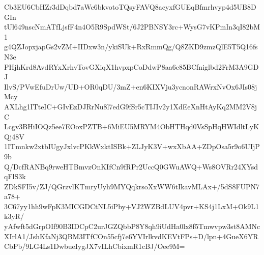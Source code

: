 Cb3EU6CbHZr3dDqbd7aWc6bkvotoTQsyFAVQ8acyxfGUEqBfmrhvyp4d5UB8DGIn
tUl649nscNmATfLjsfF4n4O5R9SpdWSt/6J2PBNSY3rc+WysG7vKPmIn3qI82bM1
g4QZJopxjapGs2vZM+IIDxw3n/ykiSUk+RxRmmQg/Q8ZKD9zmzQlE5T5Q16fsN3e
PHjhKrd8AvdRYxXrhvTovGXiqX1hvpxpCoDdwP8aa6c85BCfniglbd2FrM3A9GDJ
IlvS/PVwEfuDrUw/UD+OR0qDU/3mZ+en6KIXVju3ycnonRAWrxNvOx6JIs08jMcy
AXLhg1ITteIC+GIvEzDJRrNu8l7edG9fSr5cTIJIv2y1XdEeXnHtAyKq2MM2V8jC
Lcgv3BHiIOQz5ee7EOoxPZTB+6MiEU5MRYM4ObHTHqd0VsSpHqHWIdltLyKQj48V
1ITmnkw2xtbIUgyJxlvcPKkWxktISBk+ZLJyK3V+wxXbAA+ZDpOsa5r9o6UIjP9b
Q/DcfRANBq9rweHTBmvzOnKIfCn9fRPr2UccQ0GWuAWQ+Ws8OVRr24XYsdqFlS3k
ZDkSFI5v/ZJ/QGrzvlKTmryUyh9MYQqkrsoXxWW6tIkavMLAx+/5dS8FUPN7a78+
3C67yy1hh9wFpK3MICGDCtNL5iPby+VJ2WZBdLUV4pvr+KS4j1LxM+Ok9L1k3yR/
yAfwft5dGrpOIf90B3IDCpC2urJGZQbbP8Y8qh9iUdHa0lx8f5Tmwvpw3st8AMNc
XIrlA1/JshKfaNj3QBM3ITfCOn55cfj7e6YVIrlkvdKEVtFPs+D/lpn+4GueX6YR
CbPb/9LG4Ls1DwbueIygJX7vILhCbixmR1cBJ/Oee9M=
